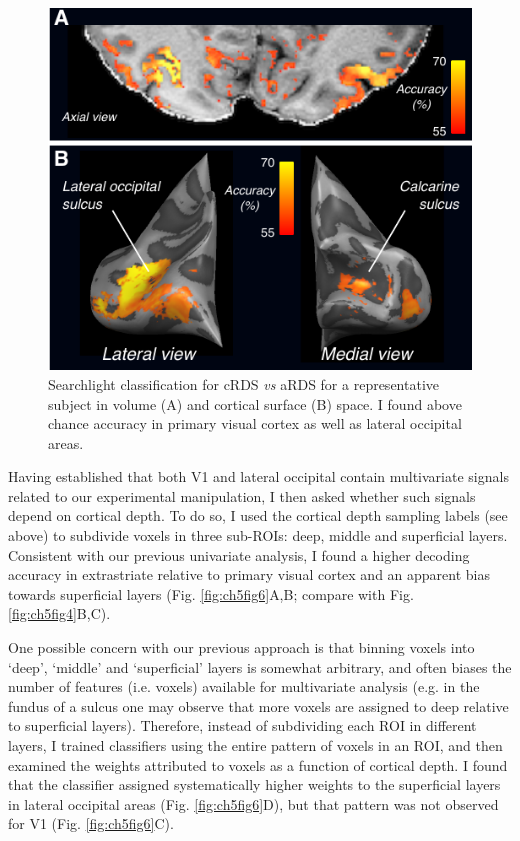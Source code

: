 \begin{figure}
  \centering
  \includegraphics[keepaspectratio]{Fig5.pdf}
  \caption[Searchlight classification for cRDS vs aRDS.]{Searchlight classification for cRDS \textit{vs} aRDS for a representative subject in volume (A) and cortical surface (B) space. I found above chance accuracy in primary visual cortex as well as lateral occipital areas.}
  \label{fig:ch5fig5}
\end{figure}

Having established that both V1 and lateral occipital contain multivariate signals related to our experimental manipulation, I then asked whether such signals depend on cortical depth. To do so, I used the cortical depth sampling labels (see above) to subdivide voxels in three sub-ROIs: deep, middle and superficial layers. Consistent with our previous univariate analysis, I found a higher decoding accuracy in extrastriate relative to primary visual cortex and an apparent bias towards superficial layers (Fig. \ref{fig:ch5fig6}A,B; compare with Fig. \ref{fig:ch5fig4}B,C).

One possible concern with our previous approach is that binning voxels into `deep', `middle' and `superficial' layers is somewhat arbitrary, and often biases the number of features (i.e. voxels) available for multivariate analysis (e.g. in the fundus of a sulcus one may observe that more voxels are assigned to deep relative to superficial layers). Therefore, instead of subdividing each ROI in different layers, I trained classifiers using the entire pattern of voxels in an ROI, and then examined the weights attributed to voxels as a function of cortical depth. I found that the classifier assigned systematically higher weights to the superficial layers in lateral occipital areas (Fig. \ref{fig:ch5fig6}D), but that pattern was not observed for V1 (Fig. \ref{fig:ch5fig6}C).

